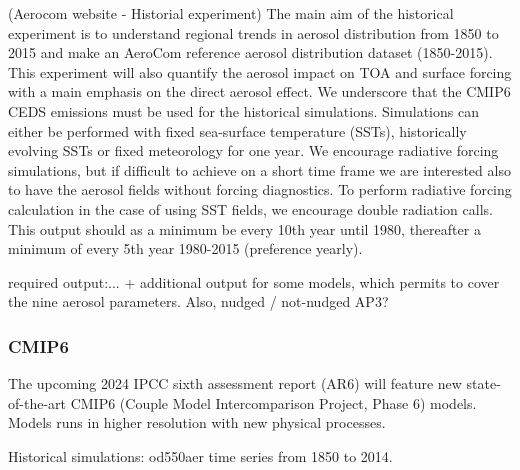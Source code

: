 \documentclass[journal abbreviation, manuscript]{copernicus}
\begin{document}
(Aerocom website - Historial experiment) The main aim of the historical experiment is to understand regional trends in aerosol distribution from 1850 to 2015 and make an AeroCom reference aerosol distribution dataset (1850-2015). This experiment will also quantify the aerosol impact on TOA and surface forcing with a main emphasis on the direct aerosol effect. We underscore that the CMIP6 CEDS emissions must be used for the historical simulations. Simulations can either be performed with fixed sea-surface temperature (SSTs), historically evolving SSTs or fixed meteorology for one year. We encourage radiative forcing simulations, but if difficult to achieve on a short time frame we are interested also to have the aerosol fields without forcing diagnostics. To perform radiative forcing calculation in the case of using SST fields, we encourage double radiation calls. This output should as a minimum be every 10th year until 1980, thereafter a minimum of every 5th year 1980-2015 (preference yearly).

required output:... + additional output for some models, which permits to cover the nine aerosol parameters.
Also, nudged / not-nudged AP3?

\subsubsection{CMIP6}
The upcoming 2024 IPCC sixth assessment report (AR6) will feature new state-of-the-art CMIP6 (Couple Model Intercomparison Project, Phase 6) models. Models runs in higher resolution with new physical processes.

Historical simulations: od550aer time series from 1850 to 2014.
\end{document}
